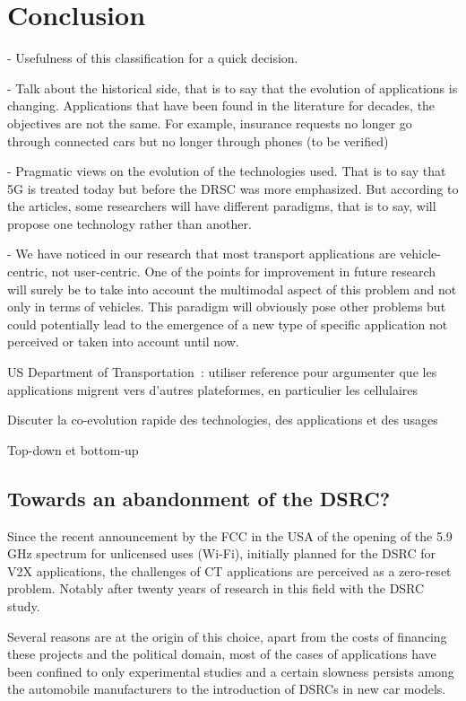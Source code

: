 \section{Conclusion}

- Usefulness of this classification for a quick decision.

- Talk about the historical side, that is to say that the evolution of applications is changing. Applications that have been found in the literature for decades, the objectives are not the same. For example, insurance requests no longer go through connected cars but no longer through phones (to be verified)

- Pragmatic views on the evolution of the technologies used. That is to say that 5G is treated today but before the DRSC was more emphasized. But according to the articles, some researchers will have different paradigms, that is to say, will propose one technology rather than another.

- We have noticed in our research that most transport applications are vehicle-centric, not user-centric. One of the points for improvement in future research will surely be to take into account the multimodal aspect of this problem and not only in terms of vehicles. This paradigm will obviously pose other problems but could potentially lead to the emergence of a new type of specific application not perceived or taken into account until now.

US Department of Transportation~\cite{usdt_smartphone_2020}: utiliser reference pour argumenter que les applications migrent vers d'autres plateformes, en particulier les cellulaires

Discuter la co-evolution rapide des technologies, des applications et des usages

Top-down et bottom-up

\subsection{Towards an abandonment of the DSRC?}

Since the recent announcement by the FCC in the USA of the opening of the 5.9 GHz spectrum for unlicensed uses (Wi-Fi)\cite{fcc_fcc_2020}, initially planned for the DSRC for V2X applications, the challenges of CT applications are perceived as a zero-reset problem. Notably after twenty years of research in this field with the DSRC study.

Several reasons are at the origin of this choice, apart from the costs of financing these projects and the political domain, most of the cases of applications have been confined to only experimental studies and a certain slowness persists among the automobile manufacturers to the introduction of DSRCs in new car models.

